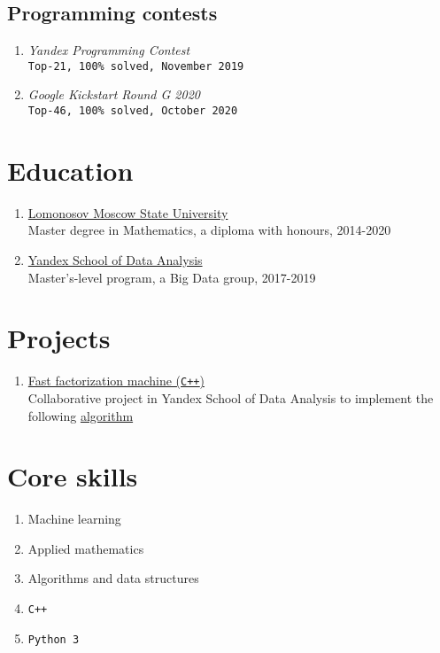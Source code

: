 \documentclass[twocolumn,10pt]{extarticle}
\begin{document}
\subsection{Programming contests}
\begin{enumerate}
  \item \textit{Yandex Programming Contest} \\
    \quad \texttt{Top-21, 100\% solved, November 2019}
  \item \textit{Google Kickstart Round G 2020} \\
    \quad \texttt{Top-46, 100\% solved, October 2020}
\end{enumerate}

\vfill

\section{Education}

\begin{enumerate}
  \item \href{https://www.msu.ru/en/}{Lomonosov Moscow State University} \\
    \quad Master degree in Mathematics, a diploma with honours, 2014-2020
  \item \href{https://yandexdataschool.com}{Yandex School of Data Analysis} \\
    \quad Master’s-level program, a Big Data group, 2017-2019
\end{enumerate}

\section{Projects}

\begin{enumerate}
\item \href{https://gitlab.com/Byobe/fast-fm-shad-2019}{Fast factorization machine (\texttt{C++})} \\
  \quad Collaborative project in Yandex School of Data Analysis to implement the following \href{https://www.csie.ntu.edu.tw/~b97053/paper/Rendle2010FM.pdf}{algorithm}
\end{enumerate}

\section{Core skills}

\begin{enumerate}
  \item Machine learning
  \item Applied mathematics
  \item Algorithms and data structures
  \item \texttt{C++}
  \item \texttt{Python 3}
\end{enumerate}
\end{document}
